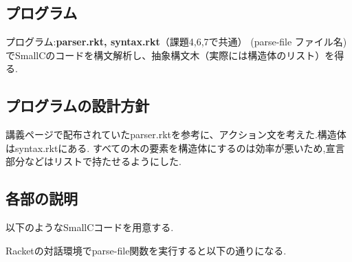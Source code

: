 \subsection{プログラム}
プログラム:\textbf{parser.rkt, syntax.rkt}（課題4,6,7で共通）
(parse-file ファイル名)でSmallCのコードを構文解析し、抽象構文木（実際には構造体のリスト）を得る.
\subsection{プログラムの設計方針}
講義ページで配布されていたparser.rktを参考に、アクション文を考えた.構造体はsyntax.rktにある.
すべての木の要素を構造体にするのは効率が悪いため,宣言部分などはリストで持たせるようにした.
\subsection{各部の説明}
以下のようなSmallCコードを用意する.

Racketの対話環境でparse-file関数を実行すると以下の通りになる.

